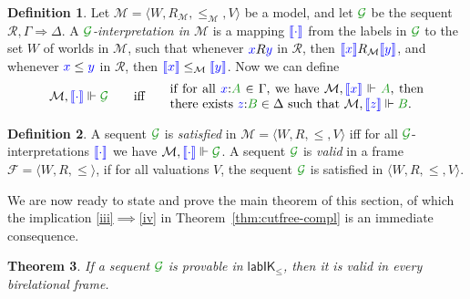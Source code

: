 \documentclass[a4paper]{article}
\theoremstyle{plain}
\newtheorem{theorem}{Theorem}[section]
\theoremstyle{definition}
\newtheorem{definition}[theorem]{Definition}
\newcommand*{\SG}{\fm{\mathcal{G}}}
\newcommand*{\IK}{\mathsf{IK}}
\newcommand*{\labIKp}{\lab\IK_{\le}}
\newcommand{\lseq}[3]{#1 , #2 \SEQ #3}
\newcommand{\B}{\mathcal{R}}
\newcommand{\Left}{\Gamma} %
\newcommand{\Right}{\Delta} %
\newcommand*{\fm}[1]{{\color{notgreen}{#1}}}
\newcommand*{\lb}[1]{{\color{blue}{#1}}}
\newcommand*{\rel}{R}
\newcommand*{\labels}[2]{\lb{#1}\mathord{:}\fm{#2}}
\newcommand*{\accs}[2]{\lb{#1}R\lb{#2}}
\newcommand*{\futs}[2]{\lb{#1}\le{\lb{#2}}}
\newcommand{\SEQ}{\Longrightarrow}
\newcommand*{\lab}{\mathsf{lab}}
\newcommand{\M}{\mathcal{M}}
\newcommand{\F}{\mathcal{F}}
\newcommand{\inter}[1]{\lb{\llbracket #1\rrbracket}}
\begin{document}
\begin{definition}\label{def:force-seq}
	Let $\M = \langle W, \rel_\M, \le_\M, V \rangle$ be a model, and let
	$\SG$ be the sequent $\lseq\B\Left\Right$. 
	A \emph{$\SG$-interpretation
		in $\M$} is a mapping $\inter{\cdot}$ from the labels in $\SG$ to the set $W$ of worlds in $\M$, such that whenever $\accs xy$ in $\B$, then $\inter x\rel_\M\inter y$, and whenever $\futs xy$ in $\B$, then $\inter x\le_\M\inter y$. Now we can define 
	\begin{equation}
	\M,\inter\cdot\Vdash\SG\qquad\mbox{iff}\qquad
	\parbox{20em}{if for all $\labels{x}{A} \in \Gamma$, we have $\M, \inter x \Vdash \fm A$, then there exists $\labels{z}{B} \in \Delta$ such that $\M, \inter z \Vdash \fm B$.}
	\end{equation}
\end{definition}

\begin{definition}\label{def:valid-seq}
	A sequent $\SG$ is \emph{satisfied} in $\M = \langle W, \rel, \le, V
	\rangle$ iff for all $\SG$-interpretations $\inter\cdot$ we have
	$\M,\inter\cdot\Vdash\SG$.
	A sequent $\SG$ is \emph{valid} in a frame $\F = \langle W, \rel,
	\le \rangle$, if for all valuations $V$, the sequent $\SG$ is
	satisfied in $\langle W, R, \le, V \rangle$.
\end{definition}

We are now ready to state and prove the main theorem of this section, of which
the implication \ref{iii}$\implies$\ref{iv} in
Theorem~\ref{thm:cutfree-compl} is an immediate consequence.

\begin{theorem}\label{thm:soundness}
	If a sequent $\SG$ is provable in $\labIKp$, then it is valid in every birelational frame.
\end{theorem}
\end{document}
